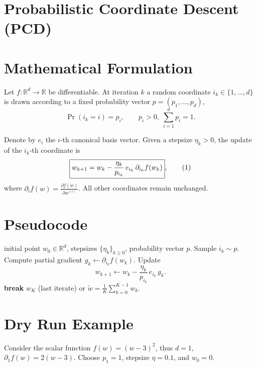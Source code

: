\documentclass{article}
\newcommand{\R}{\mathbb{R}}
\begin{document}
\section*{Probabilistic Coordinate Descent (PCD)}

\section*{Mathematical Formulation}
Let $f:\R^{d}\to\R$ be differentiable.  
At iteration $k$ a random coordinate $i_{k}\in\{1,\dots ,d\}$ is drawn
according to a fixed probability vector $p=(p_{1},\dots ,p_{d})$,
\[
\Pr(i_{k}=i)=p_{i},\qquad p_{i}>0,\;\sum_{i=1}^{d}p_{i}=1 .
\]

Denote by $e_{i}$ the $i$‑th canonical basis vector.
Given a stepsize $\eta_{k}>0$, the update of the $i_{k}$‑th coordinate is
\[
\boxed{%
w_{k+1}=w_{k}-\frac{\eta_{k}}{p_{i_{k}}}\,e_{i_{k}}\,\partial_{i_{k}}f(w_{k})},
\tag{1}
\]
where $\partial_{i}f(w)=\frac{\partial f(w)}{\partial w^{(i)}}$.
All other coordinates remain unchanged.

\section*{Pseudocode}
\begin{algorithm}[H]
\caption{Probabilistic Coordinate Descent}
\begin{algorithmic}[1]
 initial point $w_{0}\in\R^{d}$, stepsizes $\{\eta_{k}\}_{k\ge0}$, probability vector $p$.
    \STATE Sample $i_{k}\sim p$.
    \STATE Compute partial gradient $g_{k}\leftarrow \partial_{i_{k}}f(w_{k})$.
    \STATE Update 
    \[
    w_{k+1}\leftarrow w_{k}-\frac{\eta_{k}}{p_{i_{k}}}\,e_{i_{k}}\,g_{k}.
    \]
        \STATE \textbf{break}
    \ENDIF
\ENDFOR
{} $w_{K}$ (last iterate) or $\tilde w=\frac1K\sum_{k=0}^{K-1}w_{k}$.
\end{algorithmic}
\end{algorithm}

\section*{Dry Run Example}
Consider the scalar function $f(w)=(w-3)^{2}$, thus $d=1$,
$\partial_{1}f(w)=2(w-3)$.
Choose $p_{1}=1$, stepsize $\eta=0.1$, and $w_{0}=0$.
\end{document}
